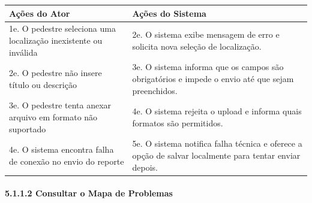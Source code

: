 \documentclass[12pt,a4paper]{article}
\begin{document}
\begin{longtable}{|>{\raggedright\arraybackslash}p{7cm}|>{\raggedright\arraybackslash}p{7cm}|}
\hline
\textbf{Ações do Ator} & \textbf{Ações do Sistema} \\
\hline
1e. O pedestre seleciona uma localização inexistente ou inválida & 2e. O sistema exibe mensagem de erro e solicita nova seleção de localização. \\
\hline
2e. O pedestre não insere título ou descrição & 3e. O sistema informa que os campos são obrigatórios e impede o envio até que sejam preenchidos. \\
\hline
3e. O pedestre tenta anexar arquivo em formato não suportado & 4e. O sistema rejeita o upload e informa quais formatos são permitidos. \\
\hline
4e. O sistema encontra falha de conexão no envio do reporte & 5e. O sistema notifica falha técnica e oferece a opção de salvar localmente para tentar enviar depois. \\
\hline
\end{longtable}

\paragraph{5.1.1.2 Consultar o Mapa de Problemas}
\end{document}
